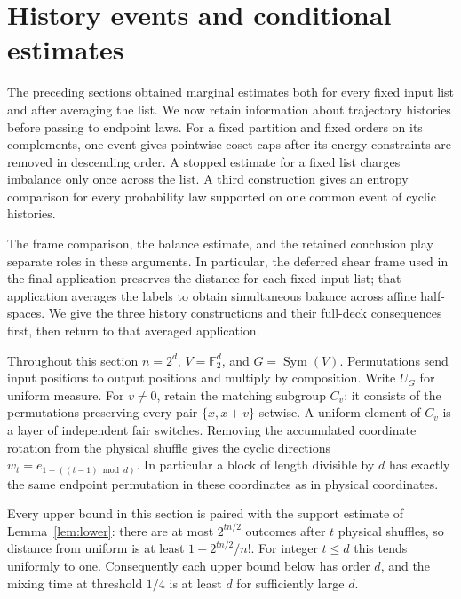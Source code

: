 \section{History events and conditional estimates}
\label{frames:chapter}

The preceding sections obtained marginal estimates both for every fixed
input list and after averaging the list. We now retain information about
trajectory histories before passing to endpoint laws. For a fixed
partition and fixed orders on its complements, one event gives pointwise
coset caps after its energy constraints are removed in descending order.
A stopped estimate for a fixed list charges imbalance only once across
the list. A third construction gives an entropy comparison for every
probability law supported on one common event of cyclic histories.

The frame comparison, the balance estimate, and the retained conclusion
play separate roles in these arguments. In particular, the deferred
shear frame used in the final application preserves the distance for
each fixed input list; that application averages the labels to obtain
simultaneous balance across affine half-spaces. We give the three history
constructions and their full-deck consequences first, then return to
that averaged application.

Throughout this section $n=2^d$, $V=\mathbb F_2^d$, and
$G=\operatorname{Sym}(V)$. Permutations send input positions to output
positions and multiply by composition. Write $U_G$ for uniform measure.
For $v\ne0$, retain the matching subgroup $C_v$: it consists of the
permutations preserving every pair $\{x,x+v\}$ setwise. A uniform element
of $C_v$ is a layer of independent fair switches. Removing the
accumulated coordinate rotation from the physical
shuffle gives the cyclic directions $w_t=e_{1+((t-1)\bmod d)}$.
In particular a block of length divisible by $d$ has exactly the same
endpoint permutation in these coordinates as in physical coordinates.

\begin{remark}\label{frames:lower-import}
Every upper bound in this section is paired with the support estimate of
Lemma~\ref{lem:lower}: there are at most $2^{tn/2}$ outcomes after $t$
physical shuffles, so distance from uniform is at least
$1-2^{tn/2}/n!$. For integer $t\le d$ this tends uniformly to one.
Consequently each upper bound below has order $d$, and the mixing time
at threshold $1/4$ is at least $d$ for sufficiently large $d$.
\end{remark}

